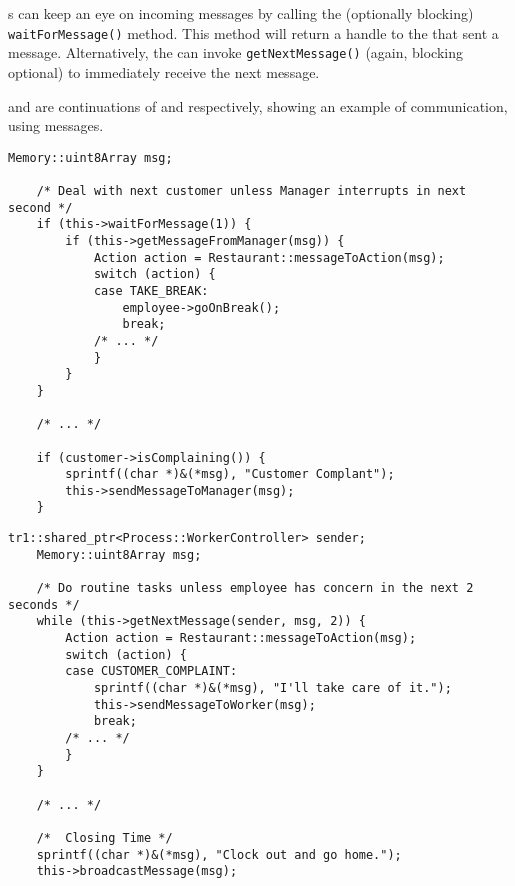 s can keep an eye on incoming messages by calling the
(optionally blocking) \texttt{wait\-For\-Message()} method.  This method will
return a handle to the  that sent a message.  Alternatively, the
 can invoke \texttt{get\-Next\-Message()} (again, blocking 
optional) to immediately receive the next message.

 and 
 are continuations of
 and 
respectively, showing an example of communication, using 
messages.

\begin{lstlisting}[caption={\class{Worker} Communication}, label=lst:process-worker-communication-example]
	Memory::uint8Array msg;

	/* Deal with next customer unless Manager interrupts in next second */
	if (this->waitForMessage(1)) {
		if (this->getMessageFromManager(msg)) {
			Action action = Restaurant::messageToAction(msg);
			switch (action) {
			case TAKE_BREAK:
				employee->goOnBreak();
				break;
			/* ... */
			}
		}
	}
	
	/* ... */
	
	if (customer->isComplaining()) {
		sprintf((char *)&(*msg), "Customer Complant");
		this->sendMessageToManager(msg);
	}
\end{lstlisting}
\begin{lstlisting}[caption={\class{Manager} Communication}, label=lst:process-manager-communication-example]
	tr1::shared_ptr<Process::WorkerController> sender;
	Memory::uint8Array msg;
	
	/* Do routine tasks unless employee has concern in the next 2 seconds */
	while (this->getNextMessage(sender, msg, 2)) {
		Action action = Restaurant::messageToAction(msg);
		switch (action) {
		case CUSTOMER_COMPLAINT:
			sprintf((char *)&(*msg), "I'll take care of it.");
			this->sendMessageToWorker(msg);
			break;
		/* ... */
		}
	}
	
	/* ... */
	
	/*  Closing Time */
	sprintf((char *)&(*msg), "Clock out and go home.");
	this->broadcastMessage(msg);
\end{lstlisting}
